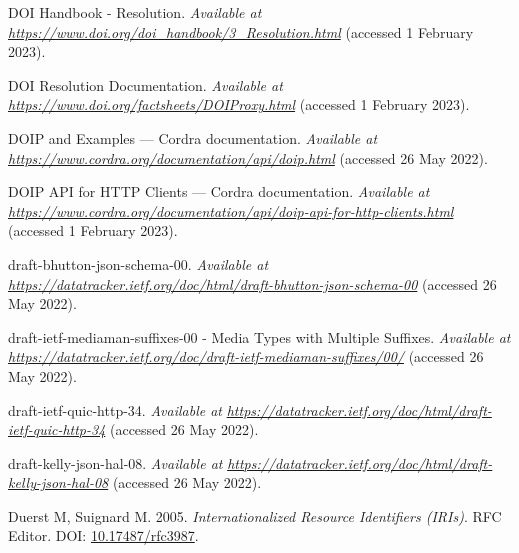 \begin{CSLReferences}{1}{0}
\leavevmode{}%
DOI Handbook - Resolution. \emph{Available at} \href{https://www.doi.org/doi_handbook/3_Resolution.html}{\emph{https://www.doi.org/doi\_handbook/3\_Resolution.html}} (accessed 1 February 2023).

\leavevmode{}%
DOI Resolution Documentation. \emph{Available at} \href{https://www.doi.org/factsheets/DOIProxy.html}{\emph{https://www.doi.org/factsheets/DOIProxy.html}} (accessed 1 February 2023).

\leavevmode{}%
DOIP and Examples --- Cordra documentation. \emph{Available at} \href{https://www.cordra.org/documentation/api/doip.html}{\emph{https://www.cordra.org/documentation/api/doip.html}} (accessed 26 May 2022).

\leavevmode{}%
DOIP API for HTTP Clients --- Cordra documentation. \emph{Available at} \href{https://www.cordra.org/documentation/api/doip-api-for-http-clients.html}{\emph{https://www.cordra.org/documentation/api/doip-api-for-http-clients.html}} (accessed 1 February 2023).

\leavevmode{}%
draft-bhutton-json-schema-00. \emph{Available at} \href{https://datatracker.ietf.org/doc/html/draft-bhutton-json-schema-00}{\emph{https://datatracker.ietf.org/doc/html/draft-bhutton-json-schema-00}} (accessed 26 May 2022).

\leavevmode{}%
draft-ietf-mediaman-suffixes-00 - Media Types with Multiple Suffixes. \emph{Available at} \href{https://datatracker.ietf.org/doc/draft-ietf-mediaman-suffixes/00/}{\emph{https://datatracker.ietf.org/doc/draft-ietf-mediaman-suffixes/00/}} (accessed 26 May 2022).

\leavevmode{}%
draft-ietf-quic-http-34. \emph{Available at} \href{https://datatracker.ietf.org/doc/html/draft-ietf-quic-http-34}{\emph{https://datatracker.ietf.org/doc/html/draft-ietf-quic-http-34}} (accessed 26 May 2022).

\leavevmode{}%
draft-kelly-json-hal-08. \emph{Available at} \href{https://datatracker.ietf.org/doc/html/draft-kelly-json-hal-08}{\emph{https://datatracker.ietf.org/doc/html/draft-kelly-json-hal-08}} (accessed 26 May 2022).

\leavevmode{}%
Duerst M, Suignard M. 2005. \emph{Internationalized Resource Identifiers (IRIs)}. RFC Editor. DOI: \href{https://doi.org/10.17487/rfc3987}{10.17487/rfc3987}.


\end{CSLReferences}
